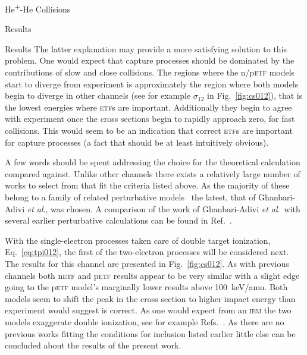 \documentclass[letterpaper, 11 pt]{report}
\begin{document}
\begin{chapter}{\texorpdfstring{He\textsuperscript{+}}{He+}-He Collisions \label{chap:hephe}}
\begin{section}{Results \label{sec:hephe-disc}}
\begin{subsection}{Results \label{sec:hephe-res}}
         The latter explanation may provide a more satisfying solution to this problem. One would expect
         that capture processes should be dominated by the contributions of slow and close collisions.
         The regions where the n/p\textsc{etf} models start to diverge from experiment is approximately
         the region where both models begin to diverge in other channels (see for example $\sigma_{12}$
         in Fig.~\ref{fig:cs012}), that is the lowest energies where \textsc{etf}s are important.
         Additionally they begin to agree with experiment once the cross sections begin to rapidly
         approach zero, for fast collisions. This would seem to be an indication that correct
         \textsc{etf}s are important for capture processes (a fact that should be at least intuitively
         obvious).

         A few words should be spent addressing the choice for the theoretical calculation compared
         against. Unlike other channels there exists a relatively large number of works to select from
         that fit the criteria listed above. As the majority of these belong to a family of related
         perturbative models~\cite{Mancev96, BOC05, Mancev-07, MG-10, NTC11, GG-12b, GAG15} the latest,
         that of Ghanbari-Adivi \textit{et al}., was chosen. A comparison of the work of Ghanbari-Adivi
         \textit{et al}.\ with several earlier perturbative calculations can be found in
         Ref.~\cite{GAG15}.

         With the single-electron processes taken care of double target ionization,
         Eq.~\eqref{eq:tpi012}, the first of the two-electron processes will be considered next. The
         results for this channel are presented in Fig.~\ref{fig:cs012}. As with previous channels both
         n\textsc{etf} and p\textsc{etf} results appear to be very similar with a slight edge going to
         the p\textsc{etf} model's marginally lower results above 100~keV/amu. Both models seem to shift
         the peak in the cross section to higher impact energy than experiment would suggest is correct.
         As one would expect from an \textsc{iem} the two models exaggerate double ionization, see for
         example Refs.~\cite{pbarhe-rev, p-he2p-he}. As there are no previous works fitting the
         conditions for inclusion listed earlier little else can be concluded about the results of the
         present work.


\end{subsection}
\end{section}
\end{chapter}
\end{document}
